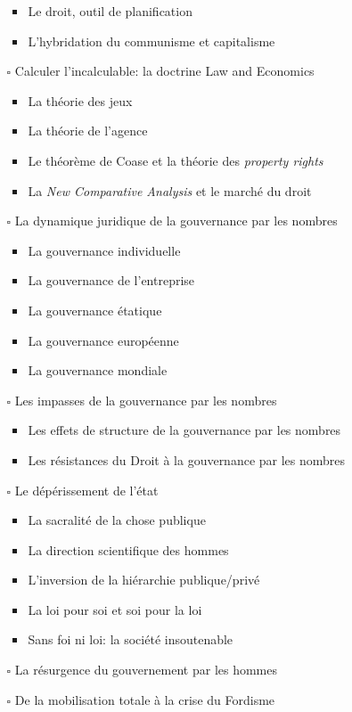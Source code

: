\documentclass[paper=B6,portrait,twoside=true,twocolumn=false,headinclude=true,footinclude=false,fontsize=12,BCOR=10mm,DIV=calc,pagesize=auto,titlepage=firstiscover,mpinclude=false,headings=normal,headings=twolinechapter,open=right,toc=graduated,chapterprefix=false,numbers=endperiod,parskip=half+]{scrbook}
\theoremstyle{definition}
\begin{document}
\begin{itemize}
\begin{itemize}
\begin{itemize}
\item Le droit, outil de planification
\item L'hybridation du communisme et capitalisme
\end{itemize}
\item[{$\square$}] Calculer l'incalculable: la doctrine Law and Economics
\begin{itemize}
\item La théorie des jeux
\item La théorie de l'agence
\item Le théorème de Coase et la théorie des \emph{property rights}
\item La \emph{New Comparative Analysis} et le marché du droit
\end{itemize}
\item[{$\square$}] La dynamique juridique de la gouvernance par les nombres
\begin{itemize}
\item La gouvernance individuelle
\item La gouvernance de l’entreprise
\item La gouvernance étatique
\item La gouvernance européenne
\item La gouvernance mondiale
\end{itemize}
\item[{$\square$}] Les impasses de la gouvernance par les nombres
\begin{itemize}
\item Les effets de structure de la gouvernance par les nombres
\item Les résistances du Droit à la gouvernance par les nombres
\end{itemize}
\item[{$\square$}] Le dépérissement de l'état
\begin{itemize}
\item La sacralité de la chose publique
\item La direction scientifique des hommes
\item L'inversion de la hiérarchie publique/privé
\item La loi pour soi et soi pour la loi
\item Sans foi ni loi: la société insoutenable
\end{itemize}
\item[{$\square$}] La résurgence du gouvernement par les hommes
\item[{$\square$}] De la mobilisation totale à la crise du Fordisme

\end{itemize}
\end{itemize}
\end{document}
